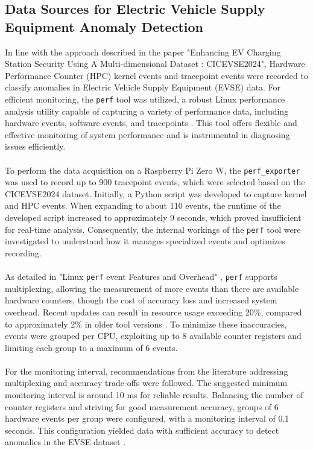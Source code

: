 \subsection{Data Sources for Electric Vehicle Supply Equipment Anomaly Detection}
\label{subsec:data_sources_for_evse_anomaly_detection}

In line with the approach described in the paper \cite{EV_Security} "Enhancing EV Charging Station Security Using A Multi-dimensional Dataset : CICEVSE2024", Hardware Performance Counter (HPC) kernel events and tracepoint events were recorded to classify anomalies in Electric Vehicle Supply Equipment (EVSE) data. For efficient monitoring, the \texttt{perf} tool was utilized, a robust Linux performance analysis utility capable of capturing a variety of performance data, including hardware events, software events, and tracepoints \cite{perf_wiki}. This tool offers flexible and effective monitoring of system performance and is instrumental in diagnosing issues efficiently.\\
\\
To perform the data acquisition on a Raspberry Pi Zero W, the \texttt{perf\_exporter}\cite{perf_exporter} was used to record up to 900 tracepoint events, which were selected based on the CICEVSE2024 dataset. Initially, a Python script was developed to capture kernel and HPC events. When expanding to about 110 events, the runtime of the developed script increased to approximately 9 seconds, which proved insufficient for real-time analysis. Consequently, the internal workings of the \texttt{perf} tool were investigated to understand how it manages specialized events and optimizes recording.\\
\\
As detailed in "Linux \texttt{perf} event Features and Overhead" \cite{perf_event_overhead}, \texttt{perf} supports multiplexing, allowing the measurement of more events than there are available hardware counters, though the cost of accuracy loss and increased system overhead. Recent updates can result in resource usage exceeding 20\%, compared to approximately 2\% in older tool versions \cite{perf_event_overhead}. To minimize these inaccuracies, events were grouped per CPU, exploiting up to 8 available counter registers and limiting each group to a maximum of 6 events. \\
\\
For the monitoring interval, recommendations from the literature \cite{perf_event_multiplexing} addressing multiplexing and accuracy trade-offs were followed. The suggested minimum monitoring interval is around 10 ms for reliable results. Balancing the number of counter registers and striving for good measurement accuracy, groups of 6 hardware events per group were configured, with a monitoring interval of 0.1 seconds. This configuration yielded data with sufficient accuracy to detect anomalies in the EVSE dataset \cite{perf_event_multiplexing}.\\
